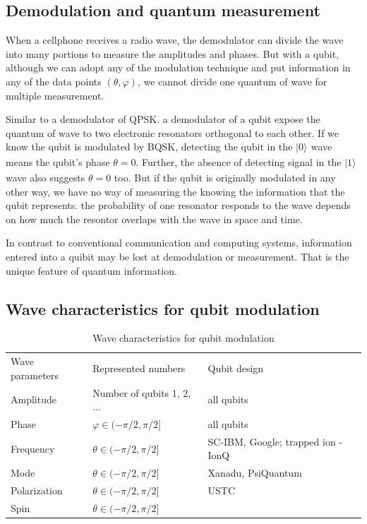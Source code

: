 \documentclass{book}
\newcommand{\keta}[2][]{\vert {#2} \rangle_{#1}}
\begin{document}
\subsection{Demodulation and quantum measurement}
When a cellphone receives a radio wave, the demodulator can divide the wave into many portions to measure the amplitudes and phases. But with a qubit, although we can adopt any of the modulation technique and put information in any of the data points $(\theta, \varphi)$, we cannot divide one quantum of wave for multiple measurement.

Similar to a demodulator of QPSK. a demodulator of a qubit expose the quantum of wave to two electronic resonators orthogonal to each other.  If we know the qubit is modulated by BQSK, detecting the qubit in the $\keta{0}$ wave means the qubit's phase $\theta = 0$. Further, the absence of detecting signal in the $\keta{1}$ wave also suggests $\theta = 0$ too. But if the qubit is originally modulated in any other way, we have no way of measuring the knowing the information that the qubit represents. the probability of one resonator responds to the wave depends on how much the resontor overlaps with the wave in space and time.

In contrast to conventional communication and computing systems, information entered into a quibit may be lost at demodulation or measurement. That is the unique feature of quantum information.

\subsection{Wave characteristics for qubit modulation}
\begin{table}[]
\caption{Wave characteristics for qubit modulation}
\label{modulation-characteristics}
\begin{tabular}{lll}
Wave parameters &Represented numbers &Qubit design   \\
Amplitude & Number of qubits 1, 2, ... & all qubits \\
Phase & $\varphi \in (-\pi /2, \pi /2] $& all qubits \\
Frequency & $\theta \in (-\pi /2, \pi /2]$ & SC-IBM, Google; trapped ion - IonQ \\
Mode & $\theta \in (-\pi /2, \pi /2]$ & Xanadu, PsiQuantum \\
Polarization & $\theta \in (-\pi /2, \pi /2]$ & USTC \\
Spin & $\theta \in (-\pi /2, \pi /2]$ & 
\end{tabular}
\end{table}
\end{document}
